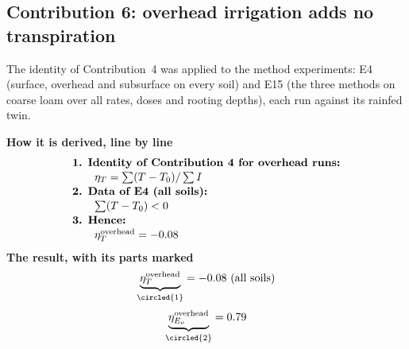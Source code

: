 \subsection{Contribution 6: overhead irrigation adds no transpiration}
\begin{derivation}
The identity of Contribution~4 was applied to the method experiments: E4 (surface, overhead and subsurface on every soil) and E15 (the three methods on coarse loam over all rates, doses and rooting depths), each run against its rainfed twin.
\end{derivation}
\begin{keyresult}
\begin{pencil}
{\small\noindent\textbf{How it is derived, line by line}
\[\begin{array}{@{}l@{}}\textbf{1. Identity of Contribution 4 for overhead runs:}\\[1pt]
\qquad \eta_T=\textstyle\sum(T-T_0)/\sum I\\[1pt]
\textbf{2. Data of E4 (all soils):}\\[1pt]
\qquad \textstyle\sum(T-T_0)<0\\[1pt]
\textbf{3. Hence:}\\[1pt]
\qquad \eta_T^{\text{overhead}}=-0.08
\end{array}\]}
\noindent\textbf{The result, with its parts marked}
\[\underbrace{\eta_T^{\text{overhead}}}_{\circled{1}}=-0.08\ \text{(all soils)}\]
\[\underbrace{\eta_{E_o}^{\text{overhead}}}_{\circled{2}}=0.79\]
\end{pencil}
\end{keyresult}
\begin{pins}
\end{pins}

